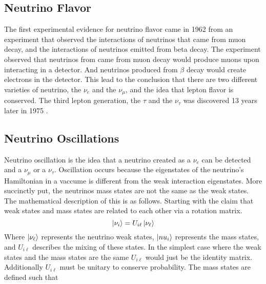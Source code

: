 \subsection{Neutrino Flavor}
The first experimental evidence for neutrino flavor came in 1962 from an
experiment \citep{lederman_muon_flavor} that observed the interactions of
neutrinos that came from muon decay, and the interactions of neutrinos emitted
from beta decay.
The experiment observed that neutrinos from came from muon decay would produce
muons upon interacting in a detector.
And neutrinos produced from $\beta$ decay would create electrons in the
detector.
This lead to the conclusion that there are two different varieties of neutrino,
the $\nu_e$ and the $\nu_{\mu}$, and the idea that lepton flavor is conserved.
The third lepton generation, the $\tau$ and the $\nu_{\tau}$ was discovered 13
years later in 1975 \citep{tau_discovery}.

\subsection{Neutrino Oscillations}
Neutrino oscillation is the idea that a neutrino created as a $\nu_e$ can be
detected and a $\nu_\mu$ or a $\nu_\tau$.
Oscillation occurs because the eigenstates of the neutrino's Hamiltonian in a
vaccume is different from the weak interaction eigenstates.
More succinctly put, the neutrinos mass states are not the same as
the weak states.
The mathematical description of this is as follows.
Starting with the claim that weak states and mass states are related to
each other via a rotation matrix.
\begin{equation}
    \ket{\nu_{i}} = U_{i\ell}\ket{\nu_\ell}
\end{equation}
Where $\ket{\nu_\ell}$ represents the neutrino weak states, $\ket{nu_i}$
represents the mass states, and $U_{i\ell}$ describes the mixing of these
states.
In the simplest case where the weak states and the mass states are the same
$U_{i\ell}$ would just be the identity matrix.
Additionally $U_{i\ell}$ must be unitary to conserve probability.
The mass states are defined such that

